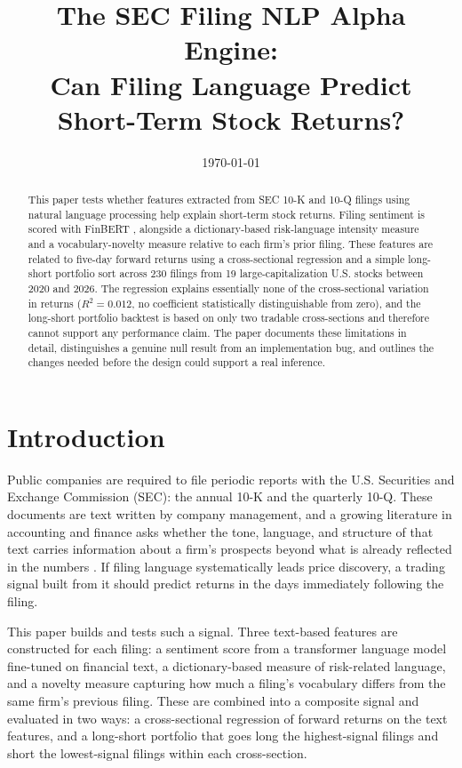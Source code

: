 \documentclass[11pt]{article}
\title{The SEC Filing NLP Alpha Engine: \\ Can Filing Language Predict Short-Term Stock Returns?}
\author{}
\date{\today}
\begin{document}
\maketitle

\begin{abstract}
\noindent This paper tests whether features extracted from SEC 10-K and 10-Q filings using natural language processing help explain short-term stock returns. Filing sentiment is scored with FinBERT \citep{araci2019}, alongside a dictionary-based risk-language intensity measure and a vocabulary-novelty measure relative to each firm's prior filing. These features are related to five-day forward returns using a cross-sectional regression and a simple long-short portfolio sort across 230 filings from 19 large-capitalization U.S. stocks between 2020 and 2026. The regression explains essentially none of the cross-sectional variation in returns ($R^2 = 0.012$, no coefficient statistically distinguishable from zero), and the long-short portfolio backtest is based on only two tradable cross-sections and therefore cannot support any performance claim. The paper documents these limitations in detail, distinguishes a genuine null result from an implementation bug, and outlines the changes needed before the design could support a real inference.
\end{abstract}

\section{Introduction}

Public companies are required to file periodic reports with the U.S. Securities and Exchange Commission (SEC): the annual 10-K and the quarterly 10-Q. These documents are text written by company management, and a growing literature in accounting and finance asks whether the tone, language, and structure of that text carries information about a firm's prospects beyond what is already reflected in the numbers \citep{loughranmcdonald2011}. If filing language systematically leads price discovery, a trading signal built from it should predict returns in the days immediately following the filing.

This paper builds and tests such a signal. Three text-based features are constructed for each filing: a sentiment score from a transformer language model fine-tuned on financial text, a dictionary-based measure of risk-related language, and a novelty measure capturing how much a filing's vocabulary differs from the same firm's previous filing. These are combined into a composite signal and evaluated in two ways: a cross-sectional regression of forward returns on the text features, and a long-short portfolio that goes long the highest-signal filings and short the lowest-signal filings within each cross-section.
\end{document}
